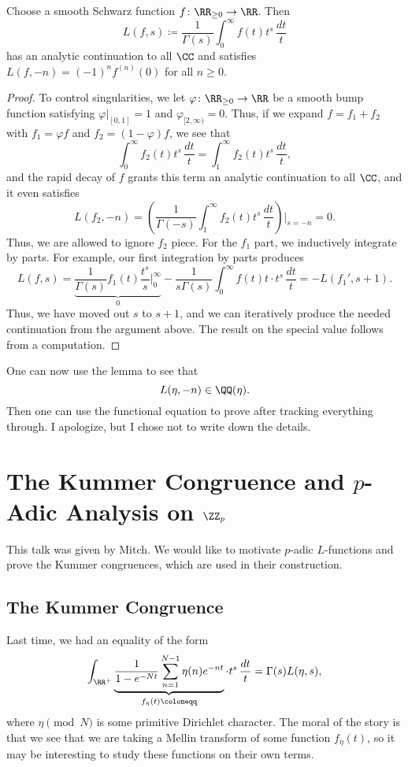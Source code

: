 \documentclass{article}
\begin{document}
\begin{lemma}
	Choose a smooth Schwarz function $f\colon\RR_{\ge0}\to\RR$. Then
	\[L(f,s)\coloneqq\frac1{\Gamma(s)}\int_0^\infty f(t)t^{s}\,\frac{dt}t\]
	has an analytic continuation to all $\CC$ and satisfies $L(f,-n)=(-1)^nf^{(n)}(0)$ for all $n\ge0$.
\end{lemma}
\begin{proof}
	To control singularities, we let $\varphi\colon\RR_{\ge0}\to\RR$ be a smooth bump function satisfying $\varphi|_{[0,1]}=1$ and $\varphi_{[2,\infty)}=0$. Thus, if we expand $f=f_1+f_2$ with $f_1=\varphi f$ and $f_2=(1-\varphi)f$, we see that
	\[\int_0^\infty f_2(t)t^s\,\frac{dt}t=\int_1^\infty f_2(t)t^s\,\frac{dt}t,\]
	and the rapid decay of $f$ grants this term an analytic continuation to all $\CC$, and it even satisfies
	\[L(f_2,-n)=\left(\frac1{\Gamma(-s)}\int_1^\infty f_2(t)t^s\,\frac{dt}t\right)\Bigg|_{s=-n}=0.\]
	Thus, we are allowed to ignore $f_2$ piece. For the $f_1$ part, we inductively integrate by parts. For example, our first integration by parts produces
	\[L(f,s)=\underbrace{\frac1{\Gamma(s)}f_1(t)\frac{t^s}s\bigg|_0^\infty}_0-\frac1{s\Gamma(s)}\int_0^\infty f(t)t\cdot t^s\,\frac{dt}t=-L(f_1',s+1).\]
	Thus, we have moved out $s$ to $s+1$, and we can iteratively produce the needed continuation from the argument above. The result on the special value follows from a computation.
\end{proof}
One can now use the lemma to see that
\[L(\eta,-n)\in\QQ(\eta).\]
Then one can use the functional equation  to prove  after tracking everything through. I apologize, but I chose not to write down the details.

\section{The Kummer Congruence and \texorpdfstring{$p$}{p}-Adic Analysis on \texorpdfstring{$\ZZ_p$}{ Zp}}
This talk was given by Mitch. We would like to motivate $p$-adic $L$-functions and prove the Kummer congruences, which are used in their construction.

\subsection{The Kummer Congruence}
Last time, we had an equality of the form
\[\int_{\RR^+}\underbrace{\frac1{1-e^{-Nt}}\sum_{n=1}^{N-1}\eta(n)e^{-nt}}_{f_\eta(t)\coloneqq}\cdot t^s\,\frac{dt}t=\Gamma(s)L(\eta,s),\]
where $\eta\pmod N$ is some primitive Dirichlet character. The moral of the story is that we see that we are taking a Mellin transform of some function $f_\eta(t)$, so it may be interesting to study these functions on their own terms.
\end{document}

